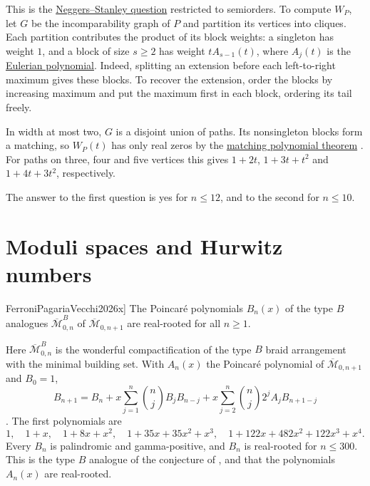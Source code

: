 This is the \hyperref[neggersStanleyConjecture]{Neggers--Stanley question}
restricted to semiorders.  To compute $W_P$, let $G$ be the
incomparability graph of $P$ and partition its vertices into cliques.
Each partition contributes the product of its block weights: a singleton
has weight $1$, and a block of size $s\geq2$ has weight $tA_{s-1}(t)$,
where $A_j(t)$ is the \hyperref[eulerianPolynomial]{Eulerian polynomial}.
Indeed, splitting an extension before each left-to-right maximum gives
these blocks.  To recover the extension, order the blocks by increasing
maximum and put the maximum first in each block, ordering its tail freely.

In width at most two, $G$ is a disjoint union of paths.  Its nonsingleton
blocks form a matching, so $W_P(t)$ has only real zeros by the
\hyperref[matchingPolynomial]{matching polynomial theorem}
\cite{HeilmannLieb1972}.  For paths on three, four and five vertices this
gives $1+2t$, $1+3t+t^2$ and $1+4t+3t^2$, respectively.

The answer to the first question is yes for $n\leq12$, and to the second
for $n\leq10$.

\section[openProblemsGeometry]{Moduli spaces and Hurwitz numbers}

\begin{conjecture}[Ferroni--Pagaria--Vecchi, \cite[Conj.~4.13]{FerroniPagariaVecchi2026x}]
\label{conjTypeBModuli}
The Poincaré polynomials $B_n(x)$ of the type $B$ analogues
$\overline{\mathcal{M}}^B_{0,n}$ of $\overline{\mathcal{M}}_{0,n+1}$ are
real-rooted for all $n\geq1$.
\end{conjecture}

Here $\overline{\mathcal{M}}^B_{0,n}$ is the wonderful compactification of
the type $B$ braid arrangement with the minimal building set.  With $A_n(x)$
the Poincaré polynomial of $\overline{\mathcal{M}}_{0,n+1}$ and $B_0=1$,
\[
  B_{n+1}=B_n+x\sum_{j=1}^n\binom nj B_jB_{n-j}
  +x\sum_{j=2}^n\binom nj 2^jA_jB_{n+1-j}
\]
\cite[Thm.~4.11]{FerroniPagariaVecchi2026x}.  The first polynomials are
\[
  1,\quad 1+x,\quad 1+8x+x^2,\quad 1+35x+35x^2+x^3,\quad
  1+122x+482x^2+122x^3+x^4.
\]
Every $B_n$ is palindromic and gamma-positive, and $B_n$ is real-rooted
for $n\leq300$.  This is the type $B$ analogue of the conjecture
of ,  and 
that the polynomials $A_n(x)$ are real-rooted.


